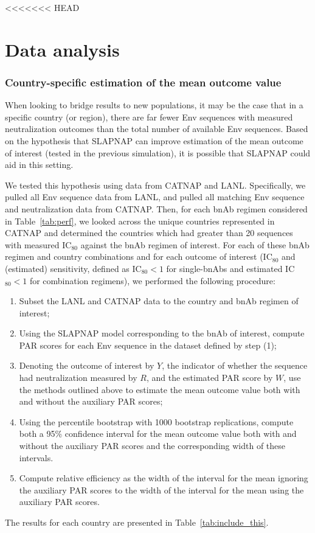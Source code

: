 \documentclass[10pt]{article}
\begin{document}



<<<<<<< HEAD
\section{Data analysis}

\subsubsection{Country-specific estimation of the mean outcome value}
When looking to bridge results to new populations, it may be the case that in a specific country (or region), there are far fewer Env sequences with measured neutralization outcomes than the total number of available Env sequences. Based on the hypothesis that SLAPNAP can improve estimation of the mean outcome of interest (tested in the previous simulation), it is possible that SLAPNAP could aid in this setting.

We tested this hypothesis using data from CATNAP and LANL. Specifically, we pulled all Env sequence data from LANL, and pulled all matching Env sequence and neutralization data from CATNAP. Then, for each bnAb regimen considered in Table~\ref{tab:perf}, we looked across the unique countries represented in CATNAP and determined the countries which had greater than 20 sequences with measured IC$_{80}$ against the bnAb regimen of interest. For each of these bnAb regimen and country combinations and for each outcome of interest (IC$_{80}$ and (estimated) sensitivity, defined as IC$_{80} < 1$ for single-bnAbs and estimated IC$_{80} < 1$ for combination regimens), we performed the following procedure:
\begin{enumerate}
    \item Subset the LANL and CATNAP data to the country and bnAb regimen of interest;
    \item Using the SLAPNAP model corresponding to the bnAb of interest, compute PAR scores for each Env sequence in the dataset defined by step (1);
    \item Denoting the outcome of interest by $Y$, the indicator of whether the sequence had neutralization measured by $R$, and the estimated PAR score by $W$, use the methods outlined above to estimate the mean outcome value both with and without the auxiliary PAR scores;
    \item Using the percentile bootstrap with 1000 bootstrap replications, compute both a 95\% confidence interval for the mean outcome value both with and without the auxiliary PAR scores and the corresponding width of these intervals.
    \item Compute relative efficiency as the width of the interval for the mean ignoring the auxiliary PAR scores to the width of the interval for the mean using the auxiliary PAR scores.
\end{enumerate}
The results for each country are presented in Table~\ref{tab:include_this}.
\end{document}
